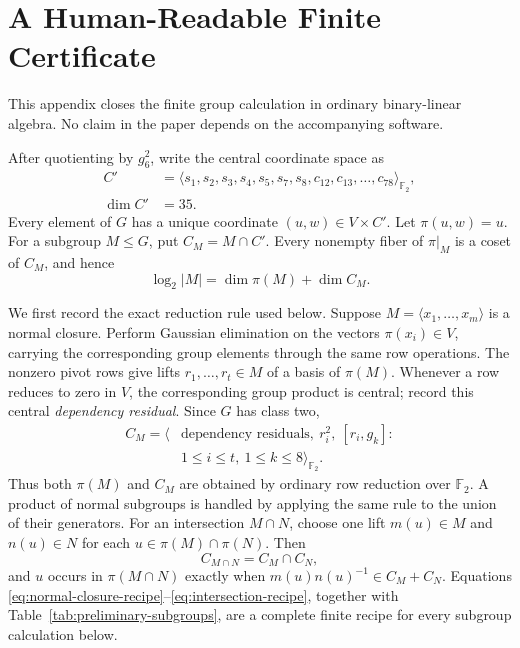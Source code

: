 \documentclass[journal]{IEEEtran}
\newcommand{\Ftwo}{\mathbb F_2}
\begin{document}
\appendices
\section{A Human-Readable Finite Certificate}\label{app:finite-certificate}
This appendix closes the finite group calculation in ordinary binary-linear
algebra.  No claim in the paper depends on the accompanying software.

After quotienting by $g_6^2$, write the central coordinate space as
\begin{align*}
 C'&=\langle s_1,s_2,s_3,s_4,s_5,s_7,s_8,
          c_{12},c_{13},\ldots,c_{78}\rangle_{\Ftwo},\\
 \dim C'&=35.
\end{align*}
Every element of $G$ has a unique coordinate $(u,w)\in V\times C'$.  Let
$\pi(u,w)=u$.  For a subgroup $M\le G$, put $C_M=M\cap C'$.  Every nonempty
fiber of $\pi|_M$ is a coset of $C_M$, and hence
\begin{equation}\label{eq:order-from-projection}
  \log_2|M|=\dim\pi(M)+\dim C_M.
\end{equation}

We first record the exact reduction rule used below.  Suppose
$M=\langle x_1,\ldots,x_m\rangle$ is a normal closure.  Perform Gaussian
elimination on the vectors $\pi(x_i)\in V$, carrying the corresponding group
elements through the same row operations.  The nonzero pivot rows give lifts
$r_1,\ldots,r_t\in M$ of a basis of $\pi(M)$.  Whenever a row reduces to zero
in $V$, the corresponding group product is central; record this central
\emph{dependency residual}.  Since $G$ has class two,
\begin{equation}\label{eq:normal-closure-recipe}
\begin{split}
 C_M=\big\langle{}&\text{dependency residuals},\ r_i^2,\ [r_i,g_k]:\\
 &1\le i\le t,\ 1\le k\le8\big\rangle_{\Ftwo}.
\end{split}
\end{equation}
Thus both $\pi(M)$ and $C_M$ are obtained by ordinary row reduction over
$\Ftwo$.  A product of normal subgroups is handled by applying the same rule to
the union of their generators.  For an intersection $M\cap N$, choose one lift
$m(u)\in M$ and $n(u)\in N$ for each
$u\in\pi(M)\cap\pi(N)$.  Then
\begin{equation}\label{eq:intersection-recipe}
 C_{M\cap N}=C_M\cap C_N,
\end{equation}
and $u$ occurs in $\pi(M\cap N)$ exactly when
$m(u)n(u)^{-1}\in C_M+C_N$.  Equations
\eqref{eq:normal-closure-recipe}--\eqref{eq:intersection-recipe}, together with
Table~\ref{tab:preliminary-subgroups}, are a complete finite recipe for every
subgroup calculation below.
\end{document}
